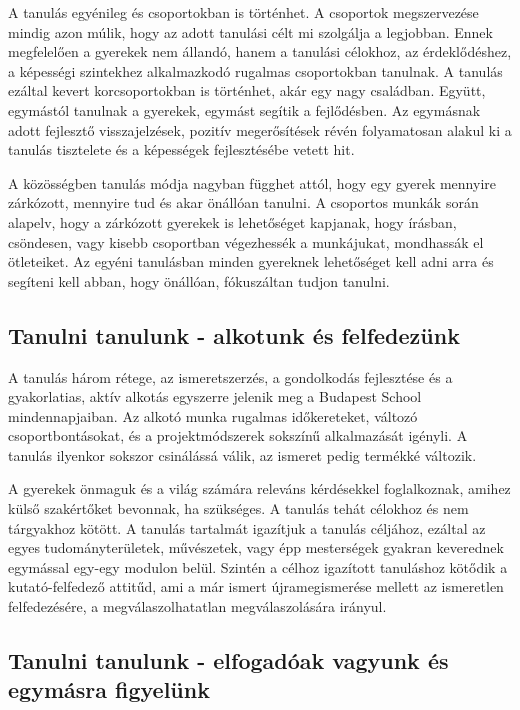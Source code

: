 A tanulás egyénileg és csoportokban is történhet. A csoportok megszervezése
mindig azon múlik, hogy az adott tanulási célt mi szolgálja a legjobban. Ennek
megfelelően a gyerekek nem állandó, hanem a tanulási célokhoz, az
érdeklődéshez, a képességi szintekhez alkalmazkodó rugalmas csoportokban
tanulnak. A tanulás ezáltal kevert korcsoportokban is történhet, akár egy nagy
családban. Együtt, egymástól tanulnak a gyerekek, egymást segítik a
fejlődésben. Az egymásnak adott fejlesztő visszajelzések, pozitív megerősítések
révén folyamatosan alakul ki a tanulás tisztelete és a képességek fejlesztésébe
vetett hit.

A közösségben tanulás módja nagyban függhet attól, hogy egy gyerek mennyire
zárkózott, mennyire tud és akar önállóan tanulni. A csoportos munkák során
alapelv, hogy a zárkózott gyerekek is lehetőséget kapjanak, hogy írásban,
csöndesen, vagy kisebb csoportban végezhessék a munkájukat, mondhassák el
ötleteiket. Az egyéni tanulásban minden gyereknek lehetőséget kell adni arra és
segíteni kell abban, hogy önállóan, fókuszáltan tudjon tanulni.

\subsection{Tanulni tanulunk - alkotunk és felfedezünk}
A tanulás három rétege, az ismeretszerzés, a gondolkodás fejlesztése és a
gyakorlatias, aktív alkotás egyszerre jelenik meg a Budapest School
mindennapjaiban. Az alkotó munka rugalmas időkereteket, változó
csoportbontásokat, és a projektmódszerek sokszínű alkalmazását igényli. A
tanulás ilyenkor sokszor csinálássá válik, az ismeret pedig termékké változik.

A gyerekek önmaguk és a világ számára releváns kérdésekkel foglalkoznak, amihez
külső szakértőket bevonnak, ha szükséges. A tanulás tehát célokhoz és nem
tárgyakhoz kötött. A tanulás tartalmát igazítjuk a tanulás céljához, ezáltal az
egyes tudományterületek, művészetek, vagy épp mesterségek gyakran keverednek
egymással egy-egy modulon belül. Szintén a célhoz igazított tanuláshoz kötődik
a kutató-felfedező attitűd, ami a már ismert újramegismerése mellett az
ismeretlen felfedezésére, a megválaszolhatatlan megválaszolására irányul.

\subsection{Tanulni tanulunk - elfogadóak vagyunk és egymásra figyelünk}

